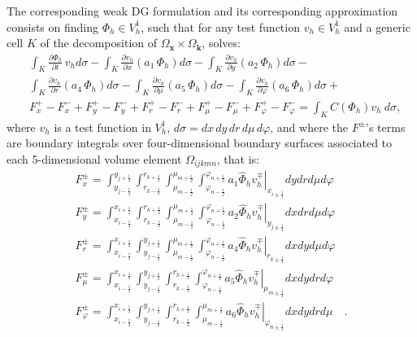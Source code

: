 \documentclass[11pt]{article}
\newcommand{\bk}{\mathbf{k}}
\newcommand{\bx}{\mathbf{x}}
\newcommand{\domk}{\Omega_{\bk}}
\begin{document}
The corresponding weak DG formulation and its corresponding approximation consists on finding
$\Phi_h \in V_h^1$, 
such that for any test function $v_h \in V_h^1$ and a generic cell $K$ of the decomposition of $\Omega_{\bx} \times \domk$, solves:
%
\begin{eqnarray}
&& 
\int_K \frac{\partial \Phi_h}{\partial t} \, v_h d\sigma - 
\int_K \frac{ \partial v_h }{\partial x} \left( a_{1} \, \Phi_h \right) d\sigma -
\int_K \frac{\partial v_h}{\partial y} \left( a_{2} \, \Phi_h \right) d\sigma  - 
\nonumber 
\\[7pt]
&&
\int_K \frac{\partial v_h}{\partial r} \left( a_{4} \, \Phi_h \right) d\sigma - 
\int_K \frac{\partial v_h}{\partial \mu} \left( a_{5} \, \Phi_h \right) d\sigma -
\int_K \frac{\partial v_h}{\partial \varphi} \left( a_{6} \, \Phi_h \right) d\sigma +
\nonumber \\ 
&& 
F_{x}^{+} - F_{x}^{-} + F_{y}^{+} - F_{y}^{-} + 
F_{r}^{+} - F_{r}^{-} + F_{\mu}^{+} - F_{\mu}^{-} + F_{\varphi}^{+} - F_{\varphi}^{-} = 
\int_K C(\Phi_h) v_h \: d\sigma  , \quad 
\label{boltztransDG}
\end{eqnarray}
%
where $v_h$ is a test function in $V_h^1$,  
$d \sigma = dx \, dy \, dr \, d\mu \, d\varphi$, and
where the $F^{\pm}$'s terms are boundary integrals over 
four-dimensional boundary surfaces associated to each 5-dimensional volume element $ \Omega_{ijkmn}$, that is:
%
\begin{eqnarray}
F_{x}^{\pm} = 
\int_{y_{j-\frac{1}{2}}}^{y_{j+\frac{1}{2}}} 
\int_{r_{k-\frac{1}{2}}}^{r_{k+\frac{1}{2}}}
\int_{\mu_{m-\frac{1}{2}}}^{\mu_{m+\frac{1}{2}}} 
\int_{\varphi_{n-\frac{1}{2}}}^{\varphi_{n+\frac{1}{2}}}
\left.
a_1 \hat{\Phi}_h v_h^{\mp} \right|_{x_{i \pm \frac{1}{2}}}
dy dr d\mu d\varphi
\nonumber\\
F_{y}^{\pm} =
\int_{x_{i-\frac{1}{2}}}^{x_{i+\frac{1}{2}}} 
\int_{r_{k-\frac{1}{2}}}^{r_{k+\frac{1}{2}}}
\int_{\mu_{m-\frac{1}{2}}}^{\mu_{m+\frac{1}{2}}} 
\int_{\varphi_{n-\frac{1}{2}}}^{\varphi_{n+\frac{1}{2}}}
\left.
a_2 \hat{\Phi}_h v_h^{\mp} \right|_{y_{j \pm \frac{1}{2}}}
dx dr d\mu d\varphi
\nonumber \\
F_{r}^{\pm} =
\int_{x_{i-\frac{1}{2}}}^{x_{i+\frac{1}{2}}}
\int_{y_{j-\frac{1}{2}}}^{y_{j+\frac{1}{2}}} 
\int_{\mu_{m-\frac{1}{2}}}^{\mu_{m+\frac{1}{2}}} 
\int_{\varphi_{n-\frac{1}{2}}}^{\varphi_{n+\frac{1}{2}}}
\left.
a_4 \hat{\Phi}_h v_h^{\mp} \right|_{r_{k \pm \frac{1}{2}}}
dx dy d\mu d\varphi
\nonumber \\
F_{\mu}^{\pm} = 
\int_{x_{i-\frac{1}{2}}}^{x_{i+\frac{1}{2}}}
\int_{y_{j-\frac{1}{2}}}^{y_{j+\frac{1}{2}}} 
\int_{r_{k-\frac{1}{2}}}^{r_{k+\frac{1}{2}}}
\int_{\varphi_{n-\frac{1}{2}}}^{\varphi_{n+\frac{1}{2}}}
\left.
a_5 \hat{\Phi}_h v_h^{\mp} \right|_{\mu_{m \pm \frac{1}{2}}}
dx dy dr d\varphi
\nonumber \\
F_{\varphi}^{\pm} =
\int_{x_{i-\frac{1}{2}}}^{x_{i+\frac{1}{2}}}
\int_{y_{j-\frac{1}{2}}}^{y_{j+\frac{1}{2}}} \int_{r_{k-\frac{1}{2}}}^{r_{k+\frac{1}{2}}}
\int_{\mu_{m-\frac{1}{2}}}^{\mu_{m+\frac{1}{2}}}
\left. 
a_6 \hat{\Phi}_h v_h^{\mp} \right|_{\varphi_{n \pm \frac{1}{2}}}
dx dy dr d\mu \quad .
\nonumber
\end{eqnarray}
\end{document}
